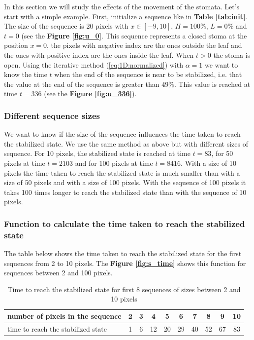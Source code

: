 In this section we will study the effects of the movement of the stomata. Let's start 
with a simple example. First, initialize a sequence like in \textbf{Table \ref{tab:init}}. The size 
of the sequence is 20 pixels with $x \in [-9,10]$, $H=100\%$, $L=0\%$ and $t=0$ (see the 
\textbf{Figure \ref{fig:u_0}}. This sequence represents a closed stoma at the position $x=0$, 
the pixels with negative index are the ones outside the leaf and the ones with positive 
index are the ones inside the leaf. When $t>0$ the stoma is open. Using the iterative 
method (\ref{eq:1D:normalized}) with $\alpha = 1$ we want to know the time $t$ when the 
end of the sequence is near to be stabilized, i.e. that the value at the end of the 
sequence is greater than $49\%$. This value is reached at time $t=336$ (see the \textbf{Figure 
\ref{fig:u_336}}).

\subsubsection{Different sequence sizes}

We want to know if the size of the sequence influences the time taken to reach the
stabilized state. We use the same method as above but with different sizes of sequence.
For 10 pixels, the stabilized state is reached at time $t=83$, for 50 pixels at time 
$t=2103$ and for 100 pixels at time $t=8416$. With a size of 10 pixels the time taken to 
reach the stabilized state is much smaller than with a size of 50 pixels and with a size 
of 100 pixels. With the sequence of 100 pixels it takes 100 times longer to reach the 
stabilized state than with the sequence of 10 pixels.

\subsubsection{Function to calculate the time taken to reach the stabilized state}

The table below shows the time taken to reach the stabilized state for the first 
sequences from 2 to 10 pixels. The \textbf{Figure \ref{fig:s_time}} shows this function
for sequences between 2 and 100 pixels.

\begin{table}[ht]
    \centering
    \begin{tabular}{|l|c|c|c|c|c|c|c|c|c|} \hline
        number of pixels in the sequence   & 2 & 3 & 4 & 5 & 6 & 7 & 8 & 9 & 10 \\\hline
        time to reach the stabilized state & 1 & 6 & 12 & 20 & 29 & 40 & 52 & 67 & 83 \\\hline
    \end{tabular}
    \caption{Time to reach the stabilized state for first 8 sequences of sizes between 2 and 10 pixels}
    \label{tab:s_time}
\end{table}

